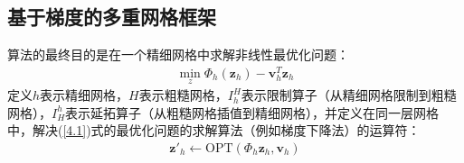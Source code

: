 \documentclass[10pt,aspectratio=169]{beamer} %
\renewcommand{\vec}[1]{\boldsymbol{#1}} %
\begin{document}
\subsection{基于梯度的多重网格框架}
\begin{frame}[allowframebreaks]
    算法的最终目的是在一个精细网格中求解非线性最优化问题：
    \begin{align}
        \min \limits_z \Phi_h (\vec{z}_h) - \vec{v}_h^T \vec{z}_h \label{4.1}
    \end{align}
    定义$h$表示精细网格，$H$表示粗糙网格，$I_h^H$表示限制算子（从精细网格限制到粗糙网格），$I_H^h$表示延拓算子（从粗糙网格插值到精细网格），并定义在同一层网格中，解决(\ref{4.1})式的最优化问题的求解算法（例如梯度下降法）的运算符：
    \begin{align*}
        \vec{z}'_h\leftarrow\mathrm{OPT}\left( \Phi_h \vec{z}_h, \vec{v}_h \right)
    \end{align*}


\end{frame}
\end{document}
